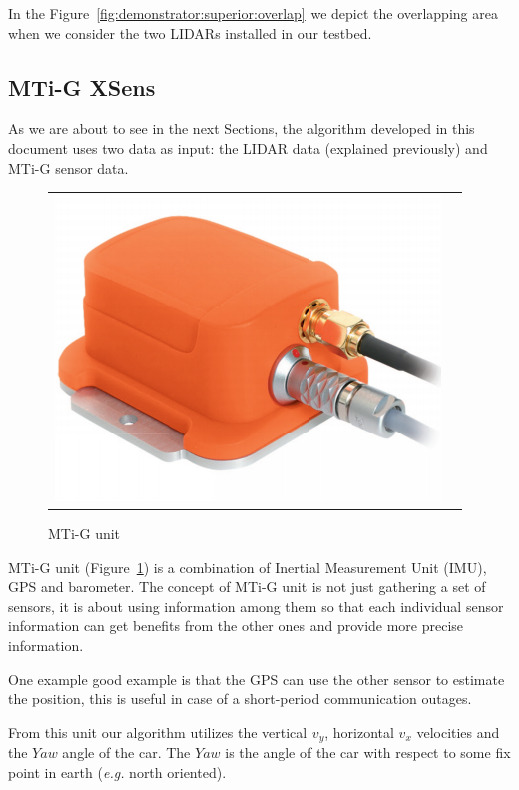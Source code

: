 In the Figure~\ref{fig:demonstrator:superior:overlap} we depict the overlapping area when we consider the two LIDARs installed in our testbed.

\subsection{MTi-G XSens}

As we are about to see in the next Sections, the algorithm developed in this document uses two data as input: the LIDAR data (explained previously) and MTi-G sensor data.

\begin{figure}[H]
   \centering
     \begin{tabular}{lr}
       \includegraphics[scale=0.3]{img/mti-g}
     \end{tabular}
   \caption{MTi-G unit}
   \label{fig:xsens:mtig}
 \end{figure}

MTi-G unit (Figure~\ref{fig:xsens:mtig}) is a combination of Inertial Measurement Unit (IMU), GPS and barometer. The concept of MTi-G unit is not just gathering a set of sensors, it is about using information among them so that each individual sensor information can get benefits from the other ones and provide more precise information.

One example good example is that the GPS can use the other sensor to estimate the position, this is useful in case of a short-period communication outages. 

From this unit our algorithm utilizes the vertical $v_y$, horizontal $v_x$ velocities and the $Yaw$ angle of the car. The $Yaw$ is the angle of the car with respect to some fix point in earth (\textit{e.g.} north oriented).

